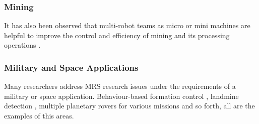\subsubsection*{Mining} 
It has also been observed that multi-robot teams as micro or mini machines are helpful to improve the control and efficiency of mining and its processing operations \cite{Dunbar+2002}.

\subsubsection*{Military and Space Applications}
Many researchers address MRS research issues under the requirements of a military or space application. Behaviour-based formation control \cite{Balch+1998}, landmine detection \cite{Franklin+1995}, multiple planetary rovers for various missions \cite{Huntsberger2004} and so forth, all are the examples of this areas.

